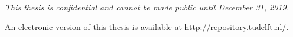 \begin{titlepage}
\begin{center}
\vspace{2em}
\emph{This thesis is confidential and cannot be made public until December 31, 2019.}

\vspace{1em}
An electronic version of this thesis is available at \url{http://repository.tudelft.nl/}.
\vspace{1em}

\end{center}
\end{titlepage}